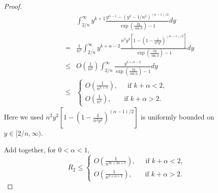 \documentclass[11pt]{article}
\begin{document}
\begin{proof}
\begin{eqnarray}
    &&\int_{2/n}^{\infty}  y^{k+1}\frac{  y^{\alpha-1} - (y^2-1/n^2)^{(\alpha-1)/2} }{\exp\left(\frac{2y}{\sin\phi}\right) - 1} dy \nonumber \\
    &=& \frac{1}{n^2} \int_{2/n}^{\infty}  y^{k+\alpha-2}\frac{ n^2 y^2\left[ 1 - (1-\frac{1}{n^2y^2})^{(\alpha-1)/2} \right]}{\exp\left(\frac{2y}{\sin\phi}\right) - 1}  dy\\
    &\leq & O(\frac{1}{n^{2}}) \int_{2/n}^{\infty} \frac{ y^{k+\alpha-2} }{\exp\left(\frac{2y}{\sin\phi}\right) - 1}  dy\\
    &\leq& \begin{cases}
        O(\frac{1}{n^{k+\alpha}}), \ \ \ \ \  \text{ if } k+\alpha < 2,\\
        O(\frac{1}{n^{2}}),\ \ \ \ \ \ \  \text{ if }  k+\alpha > 2.
    \end{cases}
\end{eqnarray}
Here we used $n^2 y^2\left[ 1 - (1-\frac{1}{n^2y^2})^{(\alpha-1)/2} \right]$ is uniformly bounded on $y \in [2/n,\infty)$.

Add together, for $0<\alpha<1$,
\begin{equation}
    R_2 \leq \begin{cases}
        O(\frac{1}{n^{2k+2\alpha+1}}), \ \ \ \ \  \text{ if } k+\alpha < 2,\\
        O(\frac{1}{n^{k+\alpha+2}}),\ \ \ \ \ \ \  \text{ if }  k+\alpha > 2.
    \end{cases}
\end{equation}


\end{proof}
\end{document}
